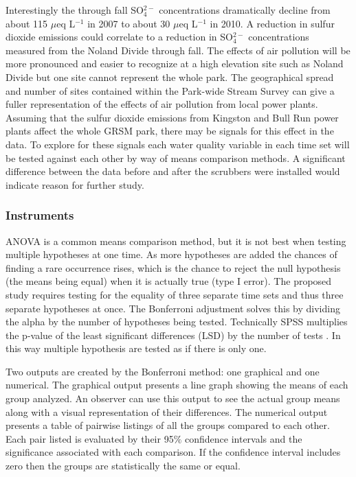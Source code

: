 Interestingly the through fall SO$_4^{2-}$ concentrations dramatically decline from about 115 $\mu$eq L$^{-1}$ in 2007 to about 30 $\mu$eq L$^{-1}$ in 2010.
A reduction in sulfur dioxide emissions could correlate to a reduction in SO$_4^{2-}$ concentrations measured from the Noland Divide through fall.
The effects of air pollution will be more pronounced and easier to recognize at a high elevation site such as Noland Divide but one site cannot represent the whole park.
The geographical spread and number of sites contained within the Park-wide Stream Survey can give a fuller representation of the effects of air pollution from local power plants.
Assuming that the sulfur dioxide emissions from Kingston and Bull Run power plants affect the whole GRSM park, there may be signals for this effect in the data.
To explore for these signals each water quality variable in each time set will be tested against each other by way of means comparison methods.
A significant difference between the data before and after the scrubbers were installed would indicate reason for further study.

\subsubsection{Instruments}
ANOVA is a common means comparison method, but it is not best when testing multiple hypotheses at one time.
As more hypotheses are added the chances of finding a rare occurrence rises, which is the chance to reject the null hypothesis (the means being equal) when it is actually true (type I error).
The proposed study requires testing for the equality of three separate time sets and thus three separate hypotheses at once.
The Bonferroni adjustment solves this by dividing the alpha by the number of hypotheses being tested.
Technically SPSS multiplies the p-value of the least significant differences (LSD) by the number of tests \citep{spss}.
In this way multiple hypothesis are tested as if there is only one.

Two outputs are created by the Bonferroni method: one graphical and one numerical.
The graphical output presents a line graph showing the means of each group analyzed.
An observer can use this output to see the actual group means along with a visual representation of their differences.
The numerical output presents a table of pairwise listings of all the groups compared to each other.
Each pair listed is evaluated by their 95$\%$ confidence intervals and the significance associated with each comparison.
If the confidence interval includes zero then the groups are statistically the same or equal.

